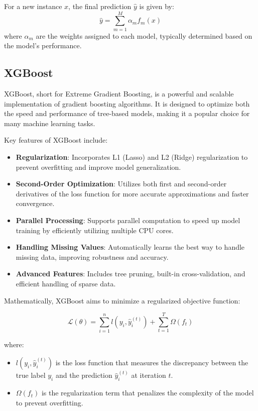 \documentclass[12pt]{article}
\begin{document}
For a new instance \( x \), the final prediction \( \hat{y} \) is given by:
\[
\hat{y} = \sum_{m=1}^{M} \alpha_m f_m(x)
\]
where \( \alpha_m \) are the weights assigned to each model, typically determined based on the model's performance.
\subsection{XGBoost}
XGBoost, short for Extreme Gradient Boosting, is a powerful and scalable implementation of gradient boosting algorithms. It is designed to optimize both the speed and performance of tree-based models, making it a popular choice for many machine learning tasks.

Key features of XGBoost include:

\begin{itemize}
    \item \textbf{Regularization}: Incorporates L1 (Lasso) and L2 (Ridge) regularization to prevent overfitting and improve model generalization.
    \item \textbf{Second-Order Optimization}: Utilizes both first and second-order derivatives of the loss function for more accurate approximations and faster convergence.
    \item \textbf{Parallel Processing}: Supports parallel computation to speed up model training by efficiently utilizing multiple CPU cores.
    \item \textbf{Handling Missing Values}: Automatically learns the best way to handle missing data, improving robustness and accuracy.
    \item \textbf{Advanced Features}: Includes tree pruning, built-in cross-validation, and efficient handling of sparse data.
\end{itemize}

Mathematically, XGBoost aims to minimize a regularized objective function:

\[
\mathcal{L}(\theta) = \sum_{i=1}^{n} l\left(y_i, \hat{y}_i^{(t)}\right) + \sum_{t=1}^{T} \Omega\left(f_t\right)
\]

where:

\begin{itemize}
    \item \( l\left(y_i, \hat{y}_i^{(t)}\right) \) is the loss function that measures the discrepancy between the true label \( y_i \) and the prediction \( \hat{y}_i^{(t)} \) at iteration \( t \).
    \item \( \Omega\left(f_t\right) \) is the regularization term that penalizes the complexity of the model to prevent overfitting.
\end{itemize}
\end{document}
